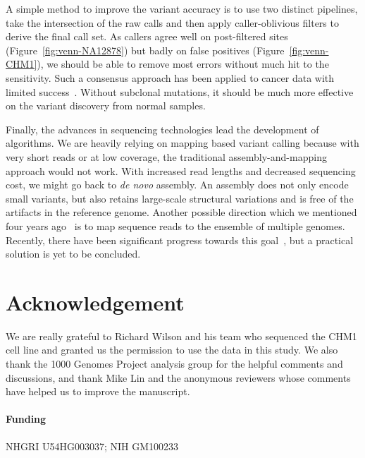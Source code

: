\documentclass{bioinfo-ori}
\begin{document}
A simple method to improve the variant accuracy is to use two distinct pipelines,
take the intersection of the raw calls and then apply caller-oblivious filters
to derive the final call set. As callers agree well on post-filtered sites
(Figure~\ref{fig:venn-NA12878}) but badly on false positives
(Figure~\ref{fig:venn-CHM1}), we should be able to remove most errors without
much hit to the sensitivity. Such a consensus approach has been applied to
cancer data with limited success~\citep{Lower:2012aa,Goode:2013aa}. Without
subclonal mutations, it should be much more effective on the variant discovery
from normal samples.

Finally, the advances in sequencing technologies lead the development of
algorithms. We are heavily relying on mapping based variant calling because
with very short reads or at low coverage, the traditional
assembly-and-mapping approach would not work. With increased read
lengths and decreased sequencing cost, we might go back to \emph{de novo}
assembly. An assembly does not only encode small variants, but also
retains large-scale structural variations and is free of the artifacts in the
reference genome. Another possible direction which we mentioned four years
ago~\citep{Li:2010kx} is to map sequence reads to the ensemble of 
multiple genomes. Recently, there have been significant progress towards this
goal~\citep{DBLP:journals/corr/abs-1010-2656,Paten:2014aa}, but a practical solution is yet to
be concluded.

\section*{Acknowledgement}
We are really grateful to Richard Wilson and his team who sequenced the CHM1 cell line
and granted us the permission to use the data in this study. We also thank the
1000 Genomes Project analysis group for the helpful comments and discussions,
and thank Mike Lin and the anonymous reviewers whose comments have helped us to
improve the manuscript.

\paragraph{Funding\textcolon} NHGRI U54HG003037; NIH GM100233


\end{document}
